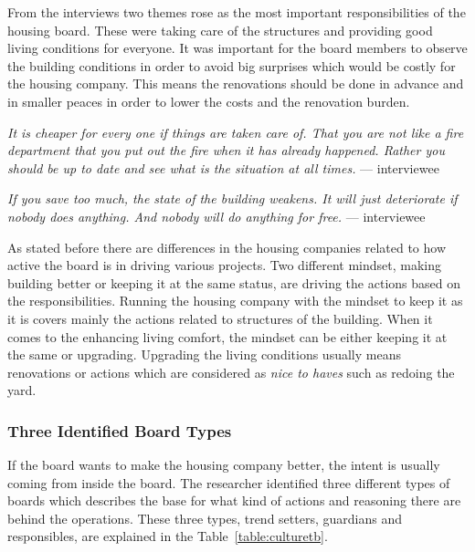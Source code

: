 From the interviews two themes rose as the most important responsibilities of the housing board. These were taking care of the structures and providing good living conditions for everyone. It was important for the board members to observe the building conditions in order to avoid big surprises which would be costly for the housing company. This means the renovations should be done in advance and in smaller peaces in order to lower the costs and the renovation burden.   

\begin{displayquote}
\textit{It is cheaper for every one if things are taken care of. That you are not like a fire department that you put out the fire when it has already happened. Rather you should be up to date and see what is the situation at all times.} --- interviewee
\end{displayquote}

\begin{displayquote}
\textit{If you save too much, the state of the building weakens. It will just deteriorate if nobody does anything. And nobody will do anything for free.} --- interviewee
\end{displayquote}

As stated before there are differences in the housing companies related to how active the board is in driving various projects. Two different mindset, making building better or keeping it at the same status, are driving the actions based on the responsibilities. Running the housing company with the mindset to keep it as it is covers mainly the actions related to structures of the building. When it comes to the enhancing living comfort, the mindset can be either keeping it at the same or upgrading. Upgrading the living conditions usually means renovations or actions which are considered as \emph{nice to haves} such as redoing the yard. 

\subsubsection*{Three Identified Board Types}

If the board wants to make the housing company better, the intent is usually coming from inside the board. The researcher identified three different types of boards which describes the base for what kind of actions and reasoning there are behind the operations. These three types, trend setters, guardians and responsibles, are explained in the Table~\ref{table:culturetb}.

